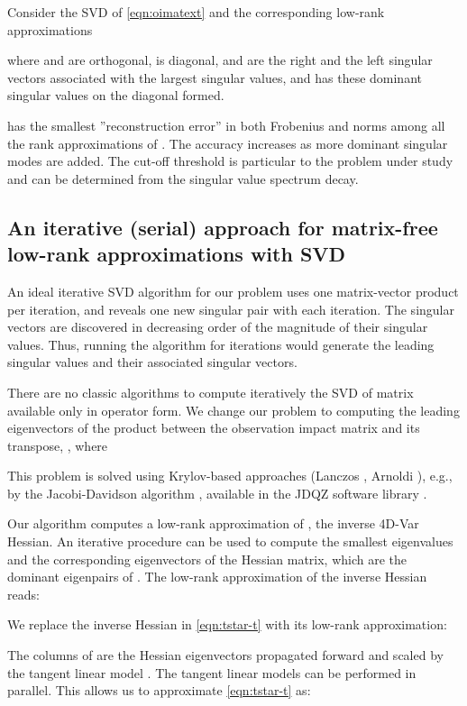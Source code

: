 \documentclass[final,sort&compress]{elsarticle}
\begin{document}
Consider the SVD of \eqref{eqn:oimatext} and the corresponding low-rank approximations

where  and  are orthogonal,  is diagonal,   and  are the right and the left singular vectors 
associated with the largest  singular values, and  has these dominant singular values on the diagonal formed.

 has the smallest ''reconstruction error'' in both Frobenius  and  norms  among all the rank  approximations of . 
The accuracy increases as more dominant singular modes are added.
The cut-off threshold is particular to the problem under study and can be determined from the singular value spectrum decay. 

\subsection{An iterative (serial) approach for matrix-free low-rank approximations with SVD}

An ideal iterative SVD algorithm for our problem uses one matrix-vector product per iteration, 
and reveals one new singular pair with each iteration.
The singular vectors are discovered in decreasing order of the magnitude of their singular values.
Thus, running the algorithm for  iterations would generate the leading  singular values and their associated singular vectors.

There are no classic algorithms to compute iteratively the SVD of matrix available only in operator form.
We change our problem to computing the leading eigenvectors of the product between the observation impact matrix and its transpose, , where

This problem is solved using Krylov-based approaches (Lanczos \cite{lanczos1950iteration}, Arnoldi \cite{arnoldi1951principle}), e.g.,
by the Jacobi-Davidson algorithm \cite{sleijpen2000jacobi}, available in the JDQZ software library \cite{fokkema1999short}.

Our algorithm computes a low-rank approximation of , the inverse 4D-Var Hessian.
An iterative procedure can be used to compute the smallest eigenvalues and the corresponding eigenvectors of the Hessian matrix,
which are the dominant eigenpairs of .
The low-rank approximation of the inverse Hessian reads:


We replace the inverse Hessian in \eqref{eqn:tstar-t} with its low-rank approximation: 


The columns of  are the Hessian eigenvectors  propagated forward and scaled by the tangent linear model . 
The  tangent linear models can be performed in parallel.
This allows us to approximate \eqref{eqn:tstar-t} as:
\end{document}
